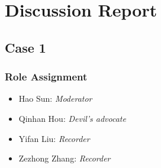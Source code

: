 \newpage
\section{Discussion Report}
	\subsection{Case 1}
		\subsubsection{Role Assignment}
		\begin{itemize}
  			\item Hao Sun: \emph{Moderator}
  			\item Qinhan Hou: \emph{Devil’s advocate}
  			\item Yifan Liu: \emph{Recorder} 
  			\item Zezhong Zhang: \emph{Recorder}
		\end{itemize}
